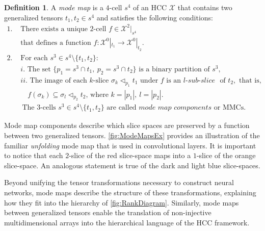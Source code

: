 \documentclass{article}
\theoremstyle{plain}
\theoremstyle{definition}
\newtheorem{definition}[theorem]{Definition}
\theoremstyle{remark}
\newcommand{\cX}{\mathcal{X}}
\begin{document}
\vspace{0.75em}
\begin{definition}
	A \textit{mode map} is a $4$-cell $s^4$ of an HCC $\mathcal{X}$ that contains two generalized tensors $t_1, t_2 \in s^4$ and satisfies the following conditions:
	\begin{equation*}
		\begin{aligned}
			\textit{1. } &\text{There exists a unique } 2\text{-cell } f \in \cX^2|_{s^4}\\ 
			&\text{that defines a function } f: \cX^0|_{t_1} \rightarrow \cX^0|_{t_2}.\\
			\textit{2. } &\text{For each } s^3 \in s^4 \setminus \{t_1, t_2\}:\\
			&\textit{i. } \text{The set } \big\{ p_1 = s^3 \cap t_1, \ p_2 = s^3 \cap t_2 \big\} \text{ is a binary partition of } s^3,\\
			&\textit{ii. } \text{The image of each } k\text{-slice } \sigma_k \vartriangleleft_{p_1} t_1 \text{ under $f$ is an } l\textit{-sub-slice } \text{ of } t_2, \text{ that is, }\\
			&\quad f(\sigma_k) \subseteq \sigma_l \vartriangleleft_{p_2} t_2 \text{, where } k = |p_1|, \ l = |p_2|.\\
			&\ \text{The } 3 \text{-cells } s^3 \in s^4 \setminus \{t_1, t_2\} \text{ are called }\textit{mode map components}\text{ or MMCs.}
		\end{aligned}
	\end{equation*}
	\label{def:MMs}
\end{definition}
Mode map components describe which slice spaces are preserved by a function between two generalized tensors. \cref{fig:ModeMapsEx} provides an illustration of the familiar \textit{unfolding} mode map that is used in convolutional layers. It is important to notice that each $2$-slice of the {\color{red}red slice-space} maps into a $1$-slice of the {\color{orange}orange slice-space}. An analogous statement is true of the {\color{blue}dark} and {\color{cyan}light} blue slice-spaces.

Beyond unifying the tensor transformations necessary to construct neural networks, mode maps describe the structure of these transformations, explaining how they fit into the hierarchy of \cref{fig:RankDiagram}. Similarly, mode maps between generalized tensors enable the translation of non-injective multidimensional arrays into the hierarchical language of the HCC framework. 
\end{document}
